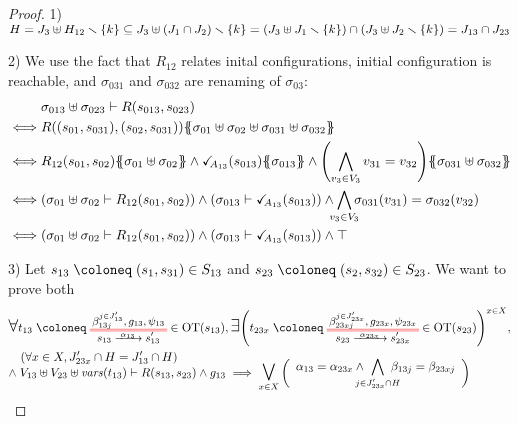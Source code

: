 \documentclass{article}
\begin{document}
\begin{proof}
\item[1)] \(H = J_3 \uplus H_{12} \smallsetminus {\left\{k\right\}} \subseteq J_3 \uplus {\left(J_1 \cap J_2\right)} \smallsetminus {\left\{k\right\}} = {\left(J_3 \uplus J_1 \smallsetminus {\left\{k\right\}}\right)} \cap {\left(J_3 \uplus J_2 \smallsetminus{\left\{k\right\}}\right)} = J_{13} \cap J_{23}\)
\item[2)] We use the fact that \(R_{12}\) relates inital configurations, initial configuration is reachable, and \(\sigma_{031}\) and \(\sigma_{032}\) are renaming of \(\sigma_{03}\):
	\begin{align*}
		& \sigma_{013} \uplus \sigma_{023} \vdash R\mpar{s_{013}, s_{023}} \\
		\iff & R\mpar{\mpar{s_{01}, s_{031}}, \mpar{s_{02}, s_{031}}}\psubst{\sigma_{01} \uplus \sigma_{02} \uplus \sigma_{031} \uplus \sigma_{032}} \\
		\iff & R_{12}\mpar{s_{01}, s_{02}}\psubst{\sigma_{01} \uplus \sigma_{02}} \wedge \reach{A_{13}}\mpar{s_{013}}\psubst{\sigma_{013}} \wedge \mpar{\bigwedge_{v_3 \in V_3} v_{31} = v_{32}}\psubst{\sigma_{031} \uplus \sigma_{032}} \\
		\iff & \mpar{\sigma_{01} \uplus \sigma_{02} \vdash R_{12}\mpar{s_{01}, s_{02}}} \wedge \mpar{\sigma_{013} \vdash \reach{A_{13}}\mpar{s_{013}}} \wedge \bigwedge_\subbox{v_3 \in V_3} \sigma_{031}\mpar{v_{31}} = \sigma_{032}\mpar{v_{32}} \\
		\iff & \mpar{\sigma_{01} \uplus \sigma_{02} \vdash R_{12}\mpar{s_{01}, s_{02}}} \wedge \mpar{\sigma_{013} \vdash \reach{A_{13}}\mpar{s_{013}}} \wedge \top
	\end{align*}
\item[3)] Let \(s_{13} \defobject \mpar{s_1, s_{31}} \in S_{13}\) and \(s_{23} \defobject \mpar{s_2, s_{32}} \in S_{23}\).
	We want to prove both
	\begin{align*}
		& \bigsymb{\forall} t_{13} \defobject \OTx{13}{}{13}{13} \in \fOT{s_{13}}, \bigsymb{\exists} \mpar{t_{23x} \defobject \OTx{23}{x}{23x}{23x} \in \fOT{s_{23}}}^{x \in X}, \\
		& \quad \mpar{\forall x \in X, J'_{23x} \cap H = J'_{13} \cap H} \\[-10pt]
		& \nwedge V_{13} \uplus V_{23} \uplus \fvars{t_{13}} \vdash R\mpar{s_{13}, s_{23}} \wedge g_{13} \implies \operatorname*{\bigsymb{\bigvee}}_{x \in X} \mpar{\everymath{\displaystyle}\begin{array}{l}
			\alpha_{13} = \alpha_{23x} \wedge \bigwedge_\subbox{j \in J'_{23x} \cap H} \beta_{13j} = \beta_{23xj} \\[12pt]

\end{array}}
\end{align*}
\end{proof}
\end{document}

